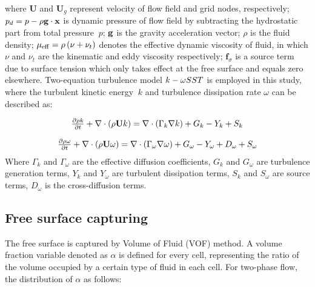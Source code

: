 \documentclass[%
 aip,
 amsmath,amssymb,
 reprint,%
]{revtex4-1}
\begin{document}
where $\mathbf{U}$ and $\mathbf{U}_g$ represent velocity of flow field and grid nodes, respectively; ${p_d} = p - \rho {\bf{g}} \cdot {\bf{x}}$ is dynamic pressure of flow field by subtracting the hydrostatic part from total pressure $\ p$; $\bf{g}$ is the gravity acceleration vector; $\rho$ is the fluid  density; ${\mu _{{\rm{eff}}}} = \rho \left( {\nu  + {\nu _t}} \right)$ denotes  the  effective dynamic viscosity of fluid, in which $\nu$ and $\nu_t$  are the kinematic and eddy viscosity respectively; $\mathbf{f}_\sigma$ is a source term due to surface tension which only takes  effect at the free surface and equals zero elsewhere.
Two-equation turbulence model $k - \omega {\rm{ }}SST$ is employed in this study, where the turbulent kinetic energy  $\ k$ and turbulence dissipation rate $\omega$ can be described as:

\begin{equation}
\begin{array}{l}
\frac{{\partial \rho k}}{{\partial t}} + \nabla  \cdot (\rho {\bf{U}}k) = \nabla  \cdot ({\Gamma _k}\nabla k) + {G_k} - {Y_k} + {S_k}\\
\end{array}
\label{con:rewardinDRL}
\end{equation}

\begin{equation}
\begin{array}{l}
\frac{{\partial \rho \omega }}{{\partial t}} + \nabla  \cdot (\rho {\bf{U}}\omega ) = \nabla  \cdot ({\Gamma _\omega }\nabla \omega ) + {G_\omega } - {Y_\omega } + {D_\omega } + {S_\omega }
\end{array}
\label{con:rewardinDRL}
\end{equation}
Where $\Gamma _k$ and $\Gamma _\omega$ are the effective diffusion coefficients, $G_k$ and $G_\omega$ are turbulence generation terms, $Y_k$ and $Y_\omega$ are turbulent dissipation terms, $S_k$ and $S_\omega$ are source terms, $D_\omega$ is the  cross-diffusion terms.

\subsection{Free surface capturing}

The free surface is captured by Volume of Fluid (VOF) method. A volume fraction variable denoted as $\alpha$ is defined for every cell, representing the ratio of the volume occupied by a certain type of fluid in each cell. For two-phase flow, the distribution of $\alpha$ as follows:
\end{document}
